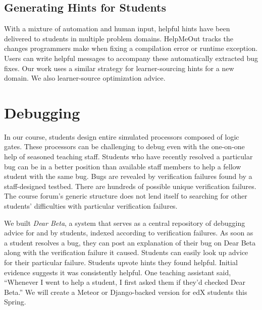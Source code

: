 \documentclass{chi-ext}
\begin{document}
\subsection{Generating Hints for Students}
With a mixture of automation and human input, helpful hints have been delivered to students in multiple problem domains. HelpMeOut \cite{helpmeout} tracks the changes programmers make when fixing a compilation error or runtime exception. Users can write helpful messages to accompany these automatically extracted bug fixes. Our work uses a similar strategy for learner-sourcing hints for a new domain. We also learner-source optimization advice.

\section{Debugging} %
In our course, students design entire simulated processors composed of logic gates. These processors can be challenging to debug even with the one­-on-­one help of seasoned teaching staff. Students who have recently resolved a particular bug can be in a better position than available staff members to help a fellow student with the same bug. Bugs are revealed by verification failures found by a staff-designed testbed. There are hundreds of possible unique verification failures. The course forum's generic structure does not lend itself to searching for other students' difficulties with particular verification failures. 


We built {\it Dear Beta}, a system that serves as a central repository of debugging advice for and by students, indexed according to verification failures. As soon as a student resolves a bug, they can post an explanation of their bug on Dear Beta along with the verification failure it caused. Students can easily look up advice for their particular failure. Students upvote hints they found helpful. Initial evidence suggests it was consistently helpful. One teaching assistant said, ``Whenever I went to help a student, I first asked them if they'd checked Dear Beta.'' We will create a Meteor or Django-backed version for edX students this Spring. 
\end{document}
